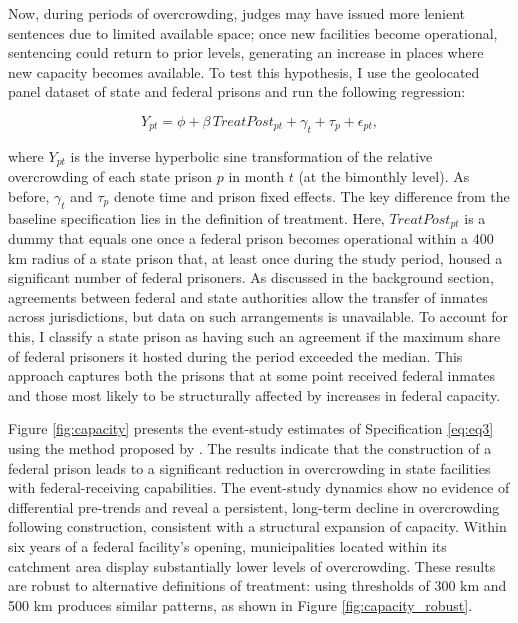 Now, during periods of overcrowding, judges may have issued more lenient sentences due to limited available space; once new facilities become operational, sentencing could return to prior levels, generating an increase in places where new capacity becomes available. To test this hypothesis, I use the geolocated panel dataset of state and federal prisons and run the following regression: 

\begin{equation}
\label{eq:eq3}
    Y_{pt} = \phi + \beta \, TreatPost_{pt} + \gamma_t + \tau_p + \epsilon_{pt},
\end{equation}

where $Y_{pt}$ is the inverse hyperbolic sine transformation of the relative overcrowding of each state prison $p$ in month $t$ (at the bimonthly level). As before, $\gamma_t$ and $\tau_p$ denote time and prison fixed effects. The key difference from the baseline specification lies in the definition of treatment. Here, $TreatPost_{pt}$ is a dummy that equals one once a federal prison becomes operational within a 400 km radius of a state prison that, at least once during the study period, housed a significant number of federal prisoners. As discussed in the background section, agreements between federal and state authorities allow the transfer of inmates across jurisdictions, but data on such arrangements is unavailable. To account for this, I classify a state prison as having such an agreement if the maximum share of federal prisoners it hosted during the period exceeded the median. This approach captures both the prisons that at some point received federal inmates and those most likely to be structurally affected by increases in federal capacity.  

Figure \ref{fig:capacity} presents the event-study estimates of Specification \ref{eq:eq3} using the method proposed by \cite{Callaway}. The results indicate that the construction of a federal prison leads to a significant reduction in overcrowding in state facilities with federal-receiving capabilities. The event-study dynamics show no evidence of differential pre-trends and reveal a persistent, long-term decline in overcrowding following construction, consistent with a structural expansion of capacity. Within six years of a federal facility’s opening, municipalities located within its catchment area display substantially lower levels of overcrowding. These results are robust to alternative definitions of treatment: using thresholds of 300 km and 500 km produces similar patterns, as shown in Figure \ref{fig:capacity_robust}.

